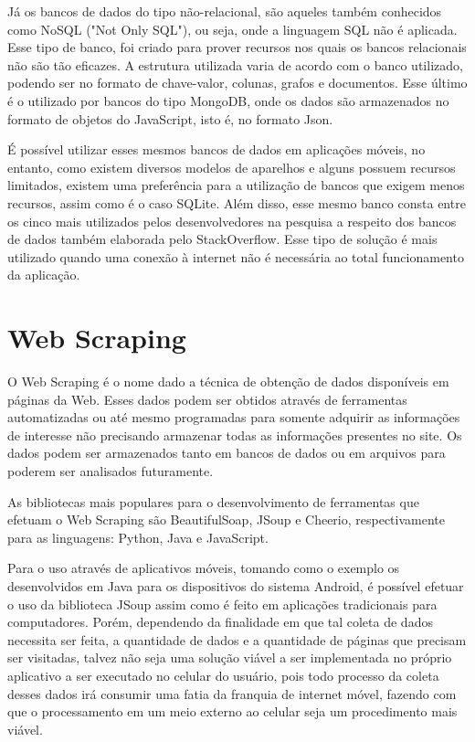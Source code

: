 Já os bancos de dados do tipo não-relacional, são aqueles também conhecidos como NoSQL ("Not Only SQL"), ou seja, onde a linguagem SQL não é aplicada. Esse tipo de banco, foi criado para prover recursos nos quais os bancos relacionais não são tão eficazes. A estrutura utilizada varia de acordo com o banco utilizado, podendo ser no formato de chave-valor, colunas, grafos e documentos. Esse último é o utilizado por bancos do tipo MongoDB, onde os dados são armazenados no formato de objetos do JavaScript, isto é, no formato Json.

É possível utilizar esses mesmos bancos de dados em aplicações móveis, no entanto, como existem diversos modelos de aparelhos e alguns possuem recursos limitados, existem uma preferência para a utilização de bancos que exigem menos recursos, assim como é o caso SQLite. Além disso, esse mesmo banco consta entre os cinco mais utilizados pelos desenvolvedores na pesquisa a respeito dos bancos de dados também elaborada pelo StackOverflow.\cite{stackOverflowRanking} Esse tipo de solução é mais utilizado quando uma conexão à internet não é necessária ao total funcionamento da aplicação.\cite{mobileDatabase}

\section{Web Scraping}

O Web Scraping\cite{webscrapingRockContent} é o nome dado a técnica de obtenção de dados disponíveis em páginas da Web. Esses dados podem ser obtidos através de ferramentas automatizadas ou até mesmo programadas para somente adquirir as informações de interesse não precisando armazenar todas as informações presentes no site.
Os dados podem ser armazenados tanto em bancos de dados ou em arquivos para poderem ser analisados futuramente.

As bibliotecas mais populares para o desenvolvimento de ferramentas que efetuam o Web Scraping são BeautifulSoap, JSoup e Cheerio, respectivamente para as linguagens: Python, Java e JavaScript.

Para o uso através de aplicativos móveis, tomando como o exemplo os desenvolvidos em Java para os dispositivos do sistema Android, é possível efetuar o uso da biblioteca JSoup assim como é feito em aplicações tradicionais para computadores. Porém, dependendo da finalidade em que tal coleta de dados necessita ser feita, a quantidade de dados e a quantidade de páginas que precisam ser visitadas, talvez não seja uma solução viável a ser implementada no próprio aplicativo a ser executado no celular do usuário, pois todo processo da coleta desses dados irá consumir uma fatia da franquia de internet móvel, fazendo com que o processamento em um meio externo ao celular seja um procedimento mais viável.

